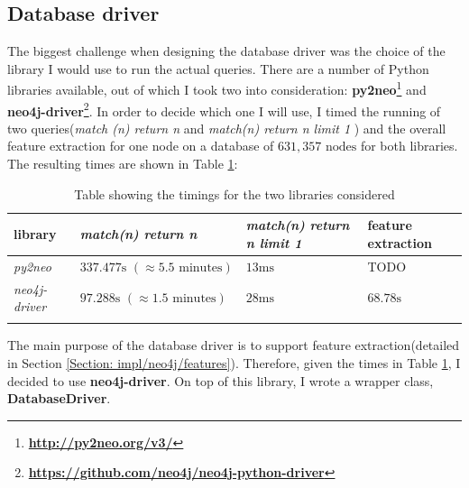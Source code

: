 	\subsection{Database driver} \label{Section: impl/neo4j/driver}
	The biggest challenge when designing the database driver was the choice of the library I would use to run the actual queries. There are a number of Python libraries available, out of which I took two into consideration: \textbf{py2neo}\footnote{\textbf{\url{http://py2neo.org/v3/}}} and \textbf{neo4j-driver}\footnote{\textbf{\url{https://github.com/neo4j/neo4j-python-driver}}}. In order to decide which one I will use, I timed the running of two queries(\textit{match (n) return n} and \textit{match(n) return n limit 1} ) and the overall feature extraction for one node on a database of $631, 357 \text{ nodes}$ for both libraries. The resulting times are shown in Table \ref{Table: impl/neo4j-driver-timings}:
	\begin{longtable}{|p{}|p{}p{}p{}|}
		\textbf{library} & \textbf{\textit{match(n) return n}} & \textbf{\textit{match(n) return n limit 1}} & \textbf{feature extraction} \\
		\hline
		\textit{py2neo} & $337.477\text{s } (\approx5.5 \text{ minutes})$ & $13\text{ms}$ & TODO \\ 
		\textit{neo4j-driver} & $97.288\text{s }(\approx1.5 \text{ minutes})$ & $28\text{ms}$ & $68.78\text{s}$  \\
		\hline
		\caption[Neo4J libraries timings]{\centering Table showing the timings for the two libraries considered}
		\label{Table: impl/neo4j-driver-timings}
	\end{longtable}
	The main purpose of the database driver is to support feature extraction(detailed in Section \ref{Section: impl/neo4j/features}). Therefore, given the times in Table \ref{Table: impl/neo4j-driver-timings}, I decided to use \textbf{neo4j-driver}. On top of this library, I wrote a wrapper class, \textbf{DatabaseDriver}. 
